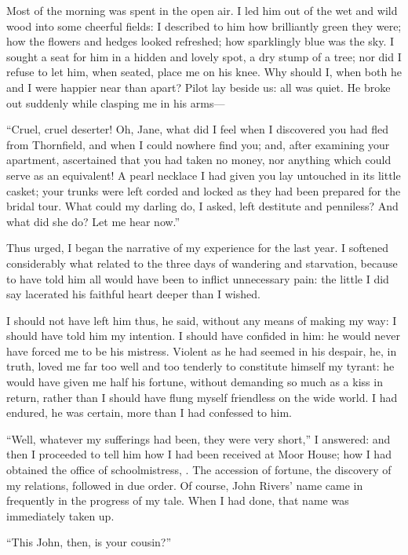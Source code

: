 Most of the morning was spent in the open air. I led him out of the wet
and wild wood into some cheerful fields: I described to him how
brilliantly green they were; how the flowers and hedges looked
refreshed; how sparklingly blue was the sky. I sought a seat for him in
a hidden and lovely spot, a dry stump of a tree; nor did I refuse to let
him, when seated, place me on his knee. Why should I, when both he and
I were happier near than apart? Pilot lay beside us: all was quiet. He
broke out suddenly while clasping me in his arms---

\enquote{Cruel, cruel deserter! Oh, Jane, what did I feel when I
discovered you had fled from Thornfield, and when I could nowhere find
you; and, after examining your apartment, ascertained that you had taken
no money, nor anything which could serve as an equivalent! A pearl
necklace I had given you lay untouched in its little casket; your trunks
were left corded and locked as they had been prepared for the bridal
tour. What could my darling do, I asked, left destitute and penniless? 
And what did she do? Let me hear now.}

Thus urged, I began the narrative of my experience for the last year. I
softened considerably what related to the three days of wandering and
starvation, because to have told him all would have been to inflict
unnecessary pain: the little I did say lacerated his faithful heart
deeper than I wished.

I should not have left him thus, he said, without any means of making my
way: I should have told him my intention. I should have confided in
him: he would never have forced me to be his mistress. Violent as he
had seemed in his despair, he, in truth, loved me far too well and too
tenderly to constitute himself my tyrant: he would have given me half
his fortune, without demanding so much as a kiss in return, rather than
I should have flung myself friendless on the wide world. I had endured,
he was certain, more than I had confessed to him.

\enquote{Well, whatever my sufferings had been, they were very short,} I
answered: and then I proceeded to tell him how I had been received at
Moor House; how I had obtained the office of schoolmistress, \etc. The
accession of fortune, the discovery of my relations, followed in due
order. Of course, \St{} John Rivers' name came in frequently in the
progress of my tale. When I had done, that name was immediately taken
up.

\enquote{This \St{} John, then, is your cousin?}

